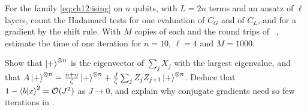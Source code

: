 \documentclass[handoutsbeamer.tex]{subfiles}
\begin{document}
\begin{frame}
\onp{\footnotesize}
\begin{exe}\label{exe:ch12:count}
For the family \eqref{eq:ch12:ising} on $n$ qubits, with $L = 2n$ terms and an ansatz of $\ell$ layers, count the Hadamard tests for one evaluation of $C_G$ and of $C_L$, and for a gradient by the shift rule. With $M$ copies of each and the round trips of \Chap~, estimate the time of one iteration for $n = 10$, $\ell = 4$ and $M = 1000$.
\end{exe}
\begin{exe}\label{exe:ch12:easy}
Show that $\ket+^{\otimes n}$ is the eigenvector of $\sum_jX_j$ with the largest eigenvalue, and that $A\ket+^{\otimes n} = \frac{n+\eta}\zeta\ket+^{\otimes n}+\frac J\zeta\sum_jZ_jZ_{j+1}\ket+^{\otimes n}$. Deduce that $1-\braket{b|x}^2 = \mathcal O(J^2)$ as $J\to0$, and explain why conjugate gradients need so few iterations in .
\end{exe}
\end{frame}

\begin{frame}[allowframebreaks]
\biblio
\end{frame}
\end{document}
